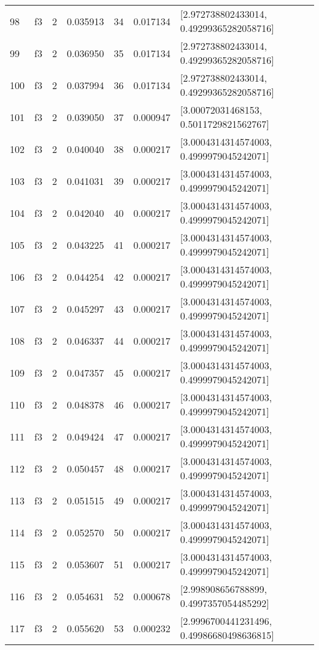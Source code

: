 \begin{tabular}{lllrlrl}
98  &  f3 &   2 &  0.035913 &   34 &  0.017134 &   [2.972738802433014, 0.49299365282058716] \\
99  &  f3 &   2 &  0.036950 &   35 &  0.017134 &   [2.972738802433014, 0.49299365282058716] \\
100 &  f3 &   2 &  0.037994 &   36 &  0.017134 &   [2.972738802433014, 0.49299365282058716] \\
101 &  f3 &   2 &  0.039050 &   37 &  0.000947 &     [3.00072031468153, 0.5011729821562767] \\
102 &  f3 &   2 &  0.040040 &   38 &  0.000217 &   [3.0004314314574003, 0.4999979045242071] \\
103 &  f3 &   2 &  0.041031 &   39 &  0.000217 &   [3.0004314314574003, 0.4999979045242071] \\
104 &  f3 &   2 &  0.042040 &   40 &  0.000217 &   [3.0004314314574003, 0.4999979045242071] \\
105 &  f3 &   2 &  0.043225 &   41 &  0.000217 &   [3.0004314314574003, 0.4999979045242071] \\
106 &  f3 &   2 &  0.044254 &   42 &  0.000217 &   [3.0004314314574003, 0.4999979045242071] \\
107 &  f3 &   2 &  0.045297 &   43 &  0.000217 &   [3.0004314314574003, 0.4999979045242071] \\
108 &  f3 &   2 &  0.046337 &   44 &  0.000217 &   [3.0004314314574003, 0.4999979045242071] \\
109 &  f3 &   2 &  0.047357 &   45 &  0.000217 &   [3.0004314314574003, 0.4999979045242071] \\
110 &  f3 &   2 &  0.048378 &   46 &  0.000217 &   [3.0004314314574003, 0.4999979045242071] \\
111 &  f3 &   2 &  0.049424 &   47 &  0.000217 &   [3.0004314314574003, 0.4999979045242071] \\
112 &  f3 &   2 &  0.050457 &   48 &  0.000217 &   [3.0004314314574003, 0.4999979045242071] \\
113 &  f3 &   2 &  0.051515 &   49 &  0.000217 &   [3.0004314314574003, 0.4999979045242071] \\
114 &  f3 &   2 &  0.052570 &   50 &  0.000217 &   [3.0004314314574003, 0.4999979045242071] \\
115 &  f3 &   2 &  0.053607 &   51 &  0.000217 &   [3.0004314314574003, 0.4999979045242071] \\
116 &  f3 &   2 &  0.054631 &   52 &  0.000678 &    [2.998908656788899, 0.4997357054485292] \\
117 &  f3 &   2 &  0.055620 &   53 &  0.000232 &  [2.9996700441231496, 0.49986680498636815] \\

\end{tabular}
